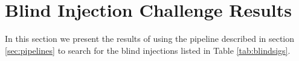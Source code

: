 % 
% 

\section{Blind Injection Challenge Results}
\label{sec:searches}

In this section we present the results of using the \ihope{} pipeline
described in section \ref{sec:pipelines} to search for the blind injections 
listed in Table \ref{tab:blindsigs}.

